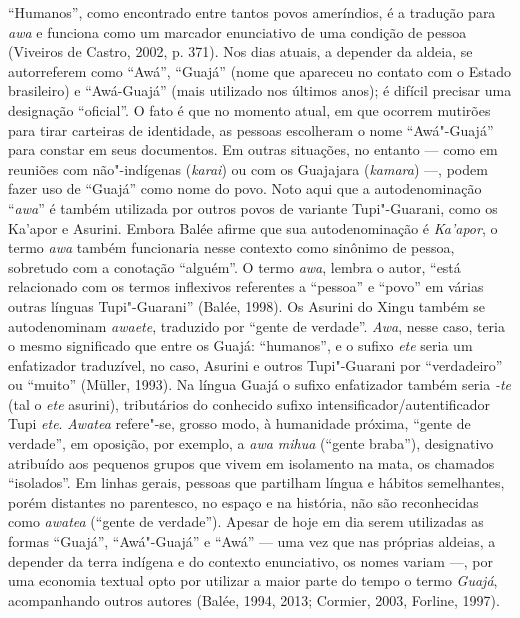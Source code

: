 ``Humanos'', como encontrado entre tantos povos ameríndios, é a tradução
para \emph{awa} e funciona como um marcador enunciativo de uma condição
de pessoa (Viveiros de Castro, 2002, p. 371). Nos dias atuais, a depender da
aldeia, se autorreferem como ``Awá'', ``Guajá'' (nome que apareceu no
contato com o Estado brasileiro) e ``Awá-Guajá'' (mais utilizado nos
últimos anos); é difícil precisar uma designação ``oficial''. O fato é que
no momento atual, em que ocorrem mutirões para tirar carteiras de
identidade, as pessoas escolheram o nome ``Awá"-Guajá'' para constar em
seus documentos. Em outras situações, no entanto --- como em reuniões com
não"-indígenas (\emph{karai}) ou com os Guajajara (\emph{kamara}) ---,
podem fazer uso de ``Guajá'' como nome do povo. Noto aqui que a
autodenominação ``\emph{awa}'' é também utilizada por outros povos de
variante Tupi"-Guarani, como os Ka'apor e Asurini. Embora Balée afirme
que sua autodenominação é \emph{Ka'apor}, o termo \emph{awa} também
funcionaria nesse contexto como sinônimo de pessoa, sobretudo com a
conotação ``alguém''. O termo \emph{awa}, lembra o autor, ``está
relacionado com os termos inflexivos referentes a ``pessoa'' e ``povo'' em
várias outras línguas Tupi"-Guarani'' (Balée, 1998). Os Asurini do Xingu
também se autodenominam \emph{awaete}, traduzido por ``gente de verdade''.
\emph{Awa}, nesse caso, teria o mesmo significado que entre os Guajá:
``humanos'', e o sufixo \emph{ete} seria um enfatizador traduzível, no
caso, Asurini e outros Tupi"-Guarani por ``verdadeiro'' ou ``muito'' (Müller,
1993). Na língua Guajá o sufixo enfatizador também seria \emph{-te}
(tal o \emph{ete} asurini), tributários do conhecido sufixo
intensificador/autentificador Tupi \emph{ete}. \emph{Awatea} refere"-se,
grosso modo, à humanidade próxima, ``gente de verdade'', em oposição,
por exemplo, a \emph{awa mihua} (``gente braba''), designativo atribuído
aos pequenos grupos que vivem em isolamento na mata, os chamados
``isolados''. Em linhas gerais, pessoas que partilham língua e hábitos
semelhantes, porém distantes no parentesco, no espaço e na história, não
são reconhecidas como \emph{awatea} (``gente de verdade''). Apesar de hoje
em dia serem utilizadas as formas ``Guajá'', ``Awá"-Guajá'' e ``Awá'' ---
uma vez que nas próprias aldeias, a depender da terra indígena e do
contexto enunciativo, os nomes variam ---, por uma economia textual opto
por utilizar a maior parte do tempo o termo \emph{Guajá}, acompanhando
outros autores (Balée, 1994, 2013; Cormier, 2003, Forline, 1997).

